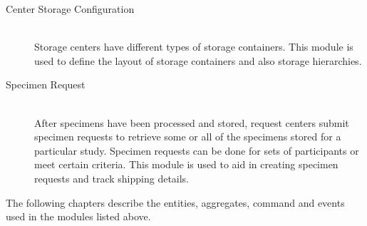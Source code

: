 \begin{description}
  \item[Center Storage Configuration] \hfill \\ Storage centers have different
    types of storage containers. This module is used to define the layout of
    storage containers and also storage hierarchies.

  \item[Specimen Request] \hfill \\ After specimens have been processed and
    stored, request centers submit specimen requests to retrieve some or all of
    the specimens stored for a particular study. Specimen requests can be done
    for sets of participants or meet certain criteria. This module is used to
    aid in creating specimen requests and track shipping details.

\end{description}

The following chapters describe the entities, aggregates, command and events
used in the  modules listed above.
